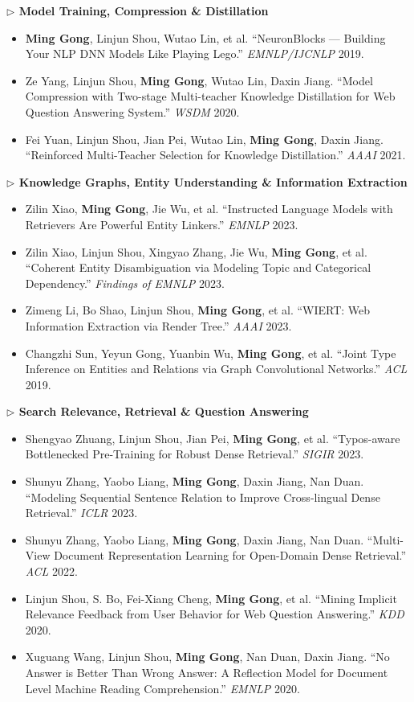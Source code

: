 \documentclass[10.5pt,letterpaper]{article}
\begin{document}
\noindent\textcolor{blue!60!black}{\textbf{$\triangleright$ Model Training, Compression \& Distillation}}
\begin{itemize}
  \item \textbf{Ming Gong}, Linjun Shou, Wutao Lin, et al. ``NeuronBlocks --- Building Your NLP DNN Models Like Playing Lego.'' \textit{EMNLP/IJCNLP} 2019.
  \item Ze Yang, Linjun Shou, \textbf{Ming Gong}, Wutao Lin, Daxin Jiang. ``Model Compression with Two-stage Multi-teacher Knowledge Distillation for Web Question Answering System.'' \textit{WSDM} 2020.
  \item Fei Yuan, Linjun Shou, Jian Pei, Wutao Lin, \textbf{Ming Gong}, Daxin Jiang. ``Reinforced Multi-Teacher Selection for Knowledge Distillation.'' \textit{AAAI} 2021.
\end{itemize}

\noindent\textcolor{blue!60!black}{\textbf{$\triangleright$ Knowledge Graphs, Entity Understanding \& Information Extraction}}
\begin{itemize}
  \item Zilin Xiao, \textbf{Ming Gong}, Jie Wu, et al. ``Instructed Language Models with Retrievers Are Powerful Entity Linkers.'' \textit{EMNLP} 2023.
  \item Zilin Xiao, Linjun Shou, Xingyao Zhang, Jie Wu, \textbf{Ming Gong}, et al. ``Coherent Entity Disambiguation via Modeling Topic and Categorical Dependency.'' \textit{Findings of EMNLP} 2023.
  \item Zimeng Li, Bo Shao, Linjun Shou, \textbf{Ming Gong}, et al. ``WIERT: Web Information Extraction via Render Tree.'' \textit{AAAI} 2023.
  \item Changzhi Sun, Yeyun Gong, Yuanbin Wu, \textbf{Ming Gong}, et al. ``Joint Type Inference on Entities and Relations via Graph Convolutional Networks.'' \textit{ACL} 2019.
\end{itemize}

\noindent\textcolor{blue!60!black}{\textbf{$\triangleright$ Search Relevance, Retrieval \& Question Answering}}
\begin{itemize}
  \item Shengyao Zhuang, Linjun Shou, Jian Pei, \textbf{Ming Gong}, et al. ``Typos-aware Bottlenecked Pre-Training for Robust Dense Retrieval.'' \textit{SIGIR} 2023.
  \item Shunyu Zhang, Yaobo Liang, \textbf{Ming Gong}, Daxin Jiang, Nan Duan. ``Modeling Sequential Sentence Relation to Improve Cross-lingual Dense Retrieval.'' \textit{ICLR} 2023.
  \item Shunyu Zhang, Yaobo Liang, \textbf{Ming Gong}, Daxin Jiang, Nan Duan. ``Multi-View Document Representation Learning for Open-Domain Dense Retrieval.'' \textit{ACL} 2022.
  \item Linjun Shou, S. Bo, Fei-Xiang Cheng, \textbf{Ming Gong}, et al. ``Mining Implicit Relevance Feedback from User Behavior for Web Question Answering.'' \textit{KDD} 2020.
  \item Xuguang Wang, Linjun Shou, \textbf{Ming Gong}, Nan Duan, Daxin Jiang. ``No Answer is Better Than Wrong Answer: A Reflection Model for Document Level Machine Reading Comprehension.'' \textit{EMNLP} 2020.
\end{itemize}
\end{document}
